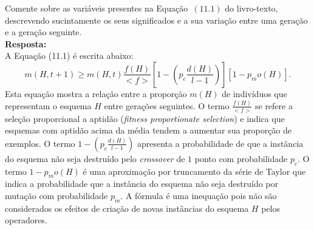 \documentclass{homeworkclass}
\begin{document}
\clearpage
\begin{homeworkProblem}
	Comente sobre as variáveis presentes na Equação~$(11.1)$ do livro-texto, descrevendo sucintamente os seus significados e a sua variação entre uma geração e a geração seguinte. \\
\textbf{Resposta:} \\
A Equação (11.1) é escrita abaixo:
\begin{equation}
m(H,t+1) \geq m(H,t) \frac{f(H)}{<f>} \left[1 - \left(p_c\frac{d(H)}{l-1}\right)\right] [1 - p_mo(H)].
\end{equation}
Esta equação mostra a relação entre a proporção $m(H)$ de indivíduos que representam o esquema $H$ entre gerações seguintes. O termo $\frac{f(H)}{<f>}$ se refere a seleção proporcional a aptidão (\emph{fitness proportionate selection}) e indica que esquemas com aptidão acima da média tendem a aumentar sua proporção de exemplos. O termo $1 - \left(p_c\frac{d(H)}{l-1}\right)$ apresenta a probabilidade de que a instância do esquema não seja destruído pelo \emph{crossover} de $1$ ponto com probabilidade $p_c$. O termo $1 - p_mo(H)$ é uma aproximação por truncamento da série de Taylor que indica a probabilidade que a instância do esquema não seja destruído por mutação com probabilidade $p_m$. A fórmula é uma inequação pois não são considerados os efeitos de criação de novas instâncias do esquema $H$ pelos operadores.
\end{homeworkProblem}
\end{document}
